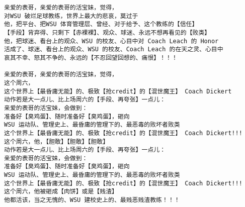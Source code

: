 \documentclass[9pt, b5paper]{article}
\begin{document}
\begin{verbatim}
亲爱的表哥，亲爱的表哥的活宝妹，觉得，
对WSU 破烂足球教练，世界上最大的悲哀，莫过于
他，把平台、把WSU 体育管理层、曾经、对于给予、这个教练的【信任】
【手段】背弃得、只剩下【赤裸裸】、观众、球迷、永远不想再看见的【败类】
他，把球迷、看台上的观众、WSU 的校友、心目中对 Coach Leach 的 Honor
活成了、球迷、看台上的观众、WSU 的校友、Coach Leach 的在天之灵、心目中
哀其不幸、怒其不争的、永远的【不忍回望回想的、痛恨】！！！

亲爱的表哥，亲爱的表哥的活宝妹，觉得，
这个周六，
这个世界上【最昏庸无能】的、极致【抢credit】的【混世魔王】 Coach Dickert
动作若是大一点儿、比上场周六的【手段、再夸张】一点儿：
亲爱的表哥的活宝妹，会做到：
准备好【臭鸡蛋】、随时准备好【臭鸡蛋】，砸向
WSU 运动队、管理史上、最昏庸的管理下的、最恶毒的败坏者败类
这个世界上【最昏庸无能】的、极致【抢credit】的【混世魔王】 Coach Dickert!!!
这个周六，他，【胆敢】【胆敢】【胆敢】
动作若是大一点儿、比上场周六的【手段、再夸张】一点儿：
亲爱的表哥的活宝妹，会做到：
准备好【臭鸡蛋】、随时准备好【臭鸡蛋】，砸向
WSU 运动队、管理史上、最昏庸的管理下的、最恶毒的败坏者败类
这个世界上【最昏庸无能】的、极致【抢credit】的【混世魔王】 Coach Dickert!!!
这个周六，他被砸成【肉饼】或是【贱渣】
他都活该，当之无愧的、WSU 建校史上的、最贱恶贱渣教练！！！


\end{verbatim}
\end{document}
